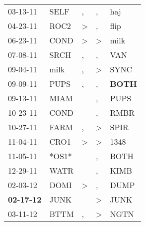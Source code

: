 \begin{supertabular}{p{0.07\textwidth}p{0.06\textwidth}p{0.02\textwidth}p{0.02\textwidth}p{0.06\textwidth}}
          03-13-11\textsuperscript{} &           SELF\textsuperscript{} &             , &             , &            haj\textsuperscript{} \\
          04-23-11\textsuperscript{} &           ROC2\textsuperscript{} &  \textgreater &             , &           flip\textsuperscript{} \\
          06-23-11\textsuperscript{} &           COND\textsuperscript{} &  \textgreater &  \textgreater &           milk\textsuperscript{} \\
          07-08-11\textsuperscript{} &           SRCH\textsuperscript{} &             , &             , &            VAN\textsuperscript{} \\
          09-04-11\textsuperscript{} &           milk\textsuperscript{} &             , &  \textgreater &           SYNC\textsuperscript{} \\
          09-09-11\textsuperscript{} &           PUPS\textsuperscript{} &             , &             , &  \textbf{BOTH\textsuperscript{}} \\
          09-13-11\textsuperscript{} &           MIAM\textsuperscript{} &               &             , &           PUPS\textsuperscript{} \\
          10-23-11\textsuperscript{} &           COND\textsuperscript{} &               &             , &           RMBR\textsuperscript{} \\
          10-27-11\textsuperscript{} &           FARM\textsuperscript{} &             , &  \textgreater &           SPIR\textsuperscript{} \\
          11-04-11\textsuperscript{} &           CRO1\textsuperscript{} &  \textgreater &  \textgreater &           1348\textsuperscript{} \\
          11-05-11\textsuperscript{} &                            *OS1* &               &             , &           BOTH\textsuperscript{} \\
          12-29-11\textsuperscript{} &           WATR\textsuperscript{} &               &             , &           KIMB\textsuperscript{} \\
          02-03-12\textsuperscript{} &           DOMI\textsuperscript{} &  \textgreater &             , &           DUMP\textsuperscript{} \\
 \textbf{02-17-12\textsuperscript{}} &           JUNK\textsuperscript{} &               &  \textgreater &           JUNK\textsuperscript{} \\
          03-11-12\textsuperscript{} &           BTTM\textsuperscript{} &             , &  \textgreater &           NGTN\textsuperscript{} \\

\end{supertabular}

